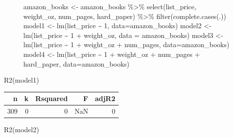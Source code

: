 \documentclass[
  letterpaper,
  DIV=11,
  numbers=noendperiod,
  oneside]{scrreprt}
\newenvironment{Shaded}{\begin{snugshade}}{\end{snugshade}}
\newcommand{\AttributeTok}[1]{\textcolor[rgb]{0.40,0.45,0.13}{#1}}
\newcommand{\DecValTok}[1]{\textcolor[rgb]{0.68,0.00,0.00}{#1}}
\newcommand{\FunctionTok}[1]{\textcolor[rgb]{0.28,0.35,0.67}{#1}}
\newcommand{\NormalTok}[1]{\textcolor[rgb]{0.00,0.23,0.31}{#1}}
\newcommand{\OtherTok}[1]{\textcolor[rgb]{0.00,0.23,0.31}{#1}}
\newcommand{\SpecialCharTok}[1]{\textcolor[rgb]{0.37,0.37,0.37}{#1}}
\begin{document}
\begin{figure}

\begin{Shaded}
\begin{Highlighting}[]
\NormalTok{amazon\_books }\OtherTok{\textless{}{-}}\NormalTok{ amazon\_books }\SpecialCharTok{\%\textgreater{}\%} 
  \FunctionTok{select}\NormalTok{(list\_price, weight\_oz, num\_pages, hard\_paper) }\SpecialCharTok{\%\textgreater{}\%}
  \FunctionTok{filter}\NormalTok{(}\FunctionTok{complete.cases}\NormalTok{(.))}
\NormalTok{model1 }\OtherTok{\textless{}{-}} \FunctionTok{lm}\NormalTok{(list\_price }\SpecialCharTok{\textasciitilde{}} \DecValTok{1}\NormalTok{, }\AttributeTok{data=}\NormalTok{amazon\_books)}
\NormalTok{model2 }\OtherTok{\textless{}{-}} \FunctionTok{lm}\NormalTok{(list\_price }\SpecialCharTok{\textasciitilde{}} \DecValTok{1} \SpecialCharTok{+}\NormalTok{ weight\_oz, }\AttributeTok{data =}\NormalTok{ amazon\_books)}
\NormalTok{model3 }\OtherTok{\textless{}{-}} \FunctionTok{lm}\NormalTok{(list\_price }\SpecialCharTok{\textasciitilde{}} \DecValTok{1} \SpecialCharTok{+}\NormalTok{ weight\_oz }\SpecialCharTok{+}\NormalTok{ num\_pages, }\AttributeTok{data=}\NormalTok{amazon\_books)}
\NormalTok{model4 }\OtherTok{\textless{}{-}} \FunctionTok{lm}\NormalTok{(list\_price }\SpecialCharTok{\textasciitilde{}} \DecValTok{1} \SpecialCharTok{+}\NormalTok{ weight\_oz }\SpecialCharTok{+}\NormalTok{ num\_pages }\SpecialCharTok{+}\NormalTok{ hard\_paper, }\AttributeTok{data=}\NormalTok{amazon\_books)}
\end{Highlighting}
\end{Shaded}

\end{figure}

\begin{Shaded}
\begin{Highlighting}[]
\FunctionTok{R2}\NormalTok{(model1)}
\end{Highlighting}
\end{Shaded}

\ttfamily 
\begin{tabular}{rrrrr}
\toprule
n & k & Rsquared & F & adjR2\\
\midrule
309 & 0 & 0 & NaN & 0\\
\bottomrule
\end{tabular} \normalfont
\bigskip

\begin{Shaded}
\begin{Highlighting}[]
\FunctionTok{R2}\NormalTok{(model2)}
\end{Highlighting}
\end{Shaded}
\end{document}
